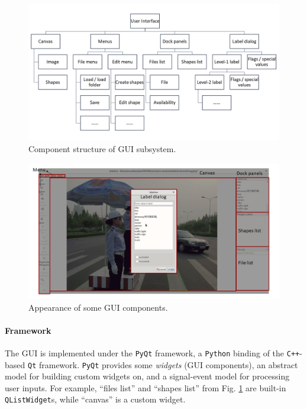 \begin{figure}[htbp!]
    \centering
    \includegraphics[width=\textwidth]{figures/structure1.png}
    \caption{Component structure of GUI subsystem.}
    \label{fig:structure_gui}
\end{figure}

\begin{figure}[htbp!]
    \centering
    \includegraphics[width=\textwidth]{figures/look.png}
    \caption{Appearance of some GUI components.}
    \label{fig:look_gui}
\end{figure}

\paragraph{Framework} The GUI is implemented under the \texttt{PyQt} framework, a \texttt{Python} binding of the \texttt{C++}-based \texttt{Qt} framework. \texttt{PyQt} provides some \textit{widgets} (GUI components), an abstract model for building custom widgets on, and a signal-event model for processing user inputs. For example, ``files list'' and ``shapes list'' from Fig. \ref{fig:structure_gui} are built-in \texttt{QListWidget}s, while ``canvas'' is a custom widget.

